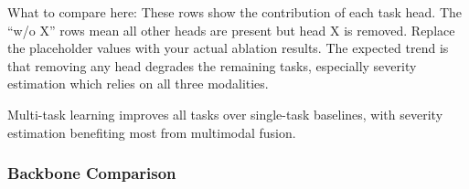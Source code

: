 \documentclass[10pt,a4paper,twocolumn]{article}
\begin{document}
\begin{table}[htbp]
\centering
\caption{Component contribution ablation}
\label{tab:ablation_component}
\end{table}

What to compare here: These rows show the contribution of each task head. The ``w/o X'' rows mean all other heads are present but head X is removed. Replace the placeholder values with your actual ablation results. The expected trend is that removing any head degrades the remaining tasks, especially severity estimation which relies on all three modalities.

Multi-task learning improves all tasks over single-task baselines, with severity estimation benefiting most from multimodal fusion.

\subsubsection{Backbone Comparison}

\begin{table}[htbp]
\centering
\caption{Backbone comparison}
\label{tab:ablation_backbone}
\end{table}
\end{document}
